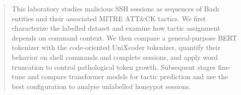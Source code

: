 
\begin{abstract}

This laboratory studies malicious SSH sessions as sequences of Bash entities and their associated MITRE ATT\&CK tactics.
We first characterize the labelled dataset and examine how tactic assignment depends on command context.
We then compare a general-purpose BERT tokenizer with the code-oriented UniXcoder tokenizer, quantify their behavior on shell commands and complete sessions, and apply word truncation to control pathological token growth.
Subsequent stages fine-tune and compare transformer models for tactic prediction and use the best configuration to analyse unlabelled honeypot sessions.

\end{abstract}
